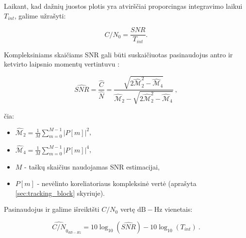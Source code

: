 \documentclass[main.tex]{subfiles}
\begin{document}
Laikant, kad dažnių juostos plotis yra atvirščiai proporcingas integravimo laikui $T_{int}$,
galime užrašyti:

\begin{equation}
    C/N_0 = \frac{SNR}{T_{int}}.
    \label{eq:snr_integration}
\end{equation}

Kompleksiniams skaičiams SNR gali būti suskaičiuotas pasinaudojus antro ir ketvirto
laipsnio momentų vertintuvu \cite{871393}:

\begin{equation}
    \widehat{SNR} = \frac{\hat{C}}{\hat{N}} = \frac{\sqrt{2 \hat{\mathcal{M}}_2^2 - \hat{\mathcal{M}}_4 }}{\hat{\mathcal{M}}_2 - \sqrt{2 \hat{\mathcal{M}}_2^2 - \hat{\mathcal{M}}_4 }}~,
    \label{eq:snr_moment}
\end{equation}

\noindent čia:
\begin{itemize}
    \item $\hat{\mathcal{M}}_2 = \frac{1}{M} \sum^{M-1}_{m=0}{\left| P[m] \right|^2}$, 
    \item $\hat{\mathcal{M}}_4 = \frac{1}{M} \sum^{M-1}_{m=0}{\left| P[m] \right|^4}$,
    \item $M$ - taškų skaičius naudojamas SNR estimacijai,
    \item $P[m]$ - nevėlinto koreliatoriaus kompleksinė vertė (aprašyta \ref{sec:tracking_block} skyriuje).
\end{itemize}

Pasinaudojus  ir  galime išreiktšti
$C/N_0$ vertę $\mathrm{dB-Hz}$ vienetais:

\begin{equation}
    \widehat{C/N}_{0_{dB-Hz}} = 10\log_{10}(\widehat{SNR})-10\log_{10}(T_{int})~.
\end{equation}
\end{document}
